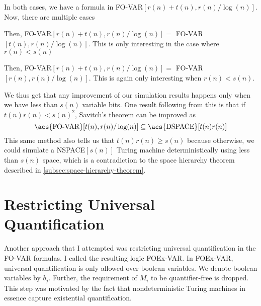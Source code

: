 In both cases, we have a formula in \acs{FO-VAR}$[r(n) + t(n), r(n)/\log(n)]$.
Now, there are multiple cases
\begin{description}
    \setlength\itemsep{0.15em}
    \item[$r(n) \leq t(n)$:]  Then, \acs{FO-VAR}$[r(n) + t(n), r(n)/\log(n)] =$ \acs{FO-VAR}$[t(n), r(n)/\log(n)]$.
    This is only interesting in the case where $r(n) < s(n)$
    \item[$r(n) > t(n)$:] Then, \acs{FO-VAR}$[r(n) + t(n), r(n)/\log(n)] =$ \acs{FO-VAR}$[r(n), r(n)/\log(n)]$.
    This is again only interesting when $r(n) < s(n)$.
\end{description}

We thus get that any improvement of our simulation results happens only when we have less than $s(n)$ variable bits.
One result following from this is that if $t(n)r(n) < s(n)^2$, Savitch's theorem can be improved as
\[
    \text{\acs{FO-VAR}}[t(n), r(n)/\log(n)] \subseteq \text{\acs{DSPACE}}[t(n)r(n)]
\]
This same method also tells us that $t(n)r(n) \geq s(n)$ because otherwise, we could simulate a \acs{NSPACE}$[s(n)]$ Turing machine deterministically using less than $s(n)$ space, which is a contradiction to the space hierarchy theorem described in \cref{subsec:space-hierarchy-theorem}.


\section{Restricting Universal Quantification}\label{sec:restricting-universal-quantification}

Another approach that I attempted was restricting universal quantification in the \acs{FO-VAR} formulas.
I called the resulting logic \acs{FOEx-VAR}\@.
In \acs{FOEx-VAR}, universal quantification is only allowed over boolean variables.
We denote boolean variables by $b_j$.
Further, the requirement of $M_i$ to be quantifier-free is dropped.
This step was motivated by the fact that nondeterministic Turing machines in essence capture existential quantification.

